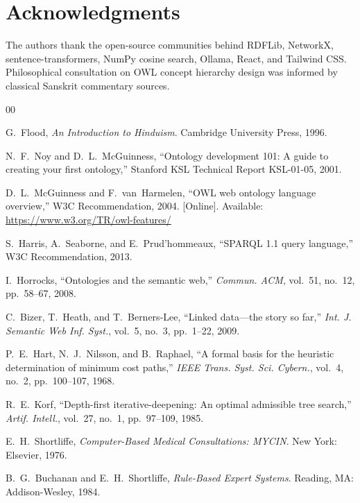\documentclass[conference]{IEEEtran}
\begin{document}
\section*{Acknowledgments}
The authors thank the open-source communities behind RDFLib, NetworkX,
sentence-transformers, NumPy cosine search, Ollama, React, and Tailwind CSS. Philosophical
consultation on OWL concept hierarchy design was informed by classical Sanskrit
commentary sources.

\begin{thebibliography}{00}

G.~Flood, \textit{An Introduction to Hinduism}.
Cambridge University Press, 1996.

N.~F.~Noy and D.~L.~McGuinness,
``Ontology development 101: A guide to creating your first ontology,''
Stanford KSL Technical Report KSL-01-05, 2001.

D.~L.~McGuinness and F.~van~Harmelen,
``OWL web ontology language overview,''
W3C Recommendation, 2004.
[Online]. Available: \url{https://www.w3.org/TR/owl-features/}

S.~Harris, A.~Seaborne, and E.~Prud'hommeaux,
``SPARQL 1.1 query language,'' W3C Recommendation, 2013.

I.~Horrocks,
``Ontologies and the semantic web,''
\textit{Commun. ACM}, vol.~51, no.~12, pp.~58--67, 2008.

C.~Bizer, T.~Heath, and T.~Berners-Lee,
``Linked data—the story so far,''
\textit{Int. J. Semantic Web Inf. Syst.}, vol.~5, no.~3, pp.~1--22, 2009.

P.~E.~Hart, N.~J.~Nilsson, and B.~Raphael,
``A formal basis for the heuristic determination of minimum cost paths,''
\textit{IEEE Trans. Syst. Sci. Cybern.}, vol.~4, no.~2, pp.~100--107, 1968.

R.~E.~Korf,
``Depth-first iterative-deepening: An optimal admissible tree search,''
\textit{Artif. Intell.}, vol.~27, no.~1, pp.~97--109, 1985.

E.~H.~Shortliffe,
\textit{Computer-Based Medical Consultations: MYCIN}.
New York: Elsevier, 1976.

B.~G.~Buchanan and E.~H.~Shortliffe,
\textit{Rule-Based Expert Systems}.
Reading, MA: Addison-Wesley, 1984.


\end{thebibliography}
\end{document}

